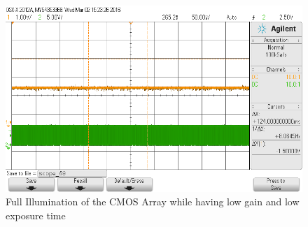\begin{figure}[H]
\begin{center}
\includegraphics[scale=0.4]{LabFour/scope_69}
\end{center}
\caption{Full Illumination of the CMOS Array while having low gain and low exposure time}
\label{fig:expos5}
\end{figure}



